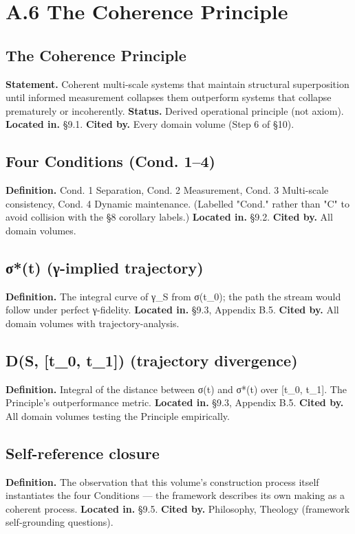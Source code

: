 \documentclass[11pt, openany]{book}
\newcommand{\sectionbreak}{\clearpage}
\begin{document}
\sectionbreak

\section{A.6 The Coherence Principle}

\subsection{The Coherence Principle}
\textbf{Statement.} Coherent multi-scale systems that maintain structural superposition until informed measurement collapses them outperform systems that collapse prematurely or incoherently.
\textbf{Status.} Derived operational principle (not axiom).
\textbf{Located in.} §9.1.
\textbf{Cited by.} Every domain volume (Step 6 of §10).

\subsection{Four Conditions (Cond. 1–4)}
\textbf{Definition.} Cond. 1 Separation, Cond. 2 Measurement, Cond. 3 Multi-scale consistency, Cond. 4 Dynamic maintenance. (Labelled "Cond." rather than "C" to avoid collision with the §8 corollary labels.)
\textbf{Located in.} §9.2.
\textbf{Cited by.} All domain volumes.

\subsection{σ*(t) (γ-implied trajectory)}
\textbf{Definition.} The integral curve of γ\_\allowbreak{}S from σ(t\_\allowbreak{}0); the path the stream would follow under perfect γ-fidelity.
\textbf{Located in.} §9.3, Appendix B.5.
\textbf{Cited by.} All domain volumes with trajectory-analysis.

\subsection{D(S, [t\_\allowbreak{}0, t\_\allowbreak{}1]) (trajectory divergence)}
\textbf{Definition.} Integral of the distance between σ(t) and σ*(t) over [t\_\allowbreak{}0, t\_\allowbreak{}1]. The Principle's outperformance metric.
\textbf{Located in.} §9.3, Appendix B.5.
\textbf{Cited by.} All domain volumes testing the Principle empirically.

\subsection{Self-reference closure}
\textbf{Definition.} The observation that this volume's construction process itself instantiates the four Conditions --- the framework describes its own making as a coherent process.
\textbf{Located in.} §9.5.
\textbf{Cited by.} Philosophy, Theology (framework self-grounding questions).
\end{document}
